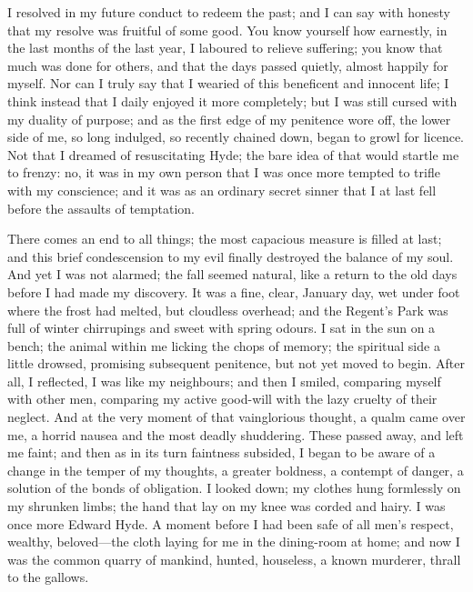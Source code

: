 \documentclass[12pt,openright]{book}
\begin{document}
I resolved in my future conduct to redeem the past; and I can say with honesty that my resolve was fruitful of some good. You know yourself how earnestly, in the last months of the last year, I laboured to relieve suffering; you know that much was done for others, and that the days passed quietly, almost happily for myself. Nor can I truly say that I wearied of this beneficent and innocent life; I think instead that I daily enjoyed it more completely; but I was still cursed with my duality of purpose; and as the first edge of my penitence wore off, the lower side of me, so long indulged, so recently chained down, began to growl for licence. Not that I dreamed of resuscitating Hyde; the bare idea of that would startle me to frenzy: no, it was in my own person that I was once more tempted to trifle with my conscience; and it was as an ordinary secret sinner that I at last fell before the assaults of temptation.

There comes an end to all things; the most capacious measure is filled at last; and this brief condescension to my evil finally destroyed the balance of my soul. And yet I was not alarmed; the fall seemed natural, like a return to the old days before I had made my discovery. It was a fine, clear, January day, wet under foot where the frost had melted, but cloudless overhead; and the Regent’s Park was full of winter chirrupings and sweet with spring odours. I sat in the sun on a bench; the animal within me licking the chops of memory; the spiritual side a little drowsed, promising subsequent penitence, but not yet moved to begin. After all, I reflected, I was like my neighbours; and then I smiled, comparing myself with other men, comparing my active good-will with the lazy cruelty of their neglect. And at the very moment of that vainglorious thought, a qualm came over me, a horrid nausea and the most deadly shuddering. These passed away, and left me faint; and then as in its turn faintness subsided, I began to be aware of a change in the temper of my thoughts, a greater boldness, a contempt of danger, a solution of the bonds of obligation. I looked down; my clothes hung formlessly on my shrunken limbs; the hand that lay on my knee was corded and hairy. I was once more Edward Hyde. A moment before I had been safe of all men’s respect, wealthy, beloved—the cloth laying for me in the dining-room at home; and now I was the common quarry of mankind, hunted, houseless, a known murderer, thrall to the gallows.
\end{document}
